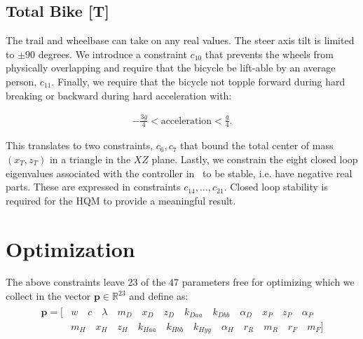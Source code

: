 \documentclass{bmd2019p}
\begin{document}
\subsection{Total Bike [T]}
%
The trail and wheelbase can take on any real values. The steer axis tilt is
limited to $\pm90$ degrees. We introduce a constraint $c_{10}$ that prevents
the wheels from physically overlapping and require that the bicycle be
lift-able by an average person, $c_{11}$. Finally, we require that the bicycle
not topple forward during hard breaking or backward during hard acceleration
with:

\begin{align}
  -\frac{3g}{4} < \textrm{acceleration} < \frac{g}{4}\textrm{.}
\end{align}

This translates to two constraints, $c_6,c_7$ that bound the total center of
mass $(x_T,z_T)$ in a triangle in the $XZ$ plane. Lastly, we constrain the
eight closed loop eigenvalues associated with the controller in~\cite{Hess2012}
to be stable, i.e. have negative real parts. These are expressed in
constraints $c_{14},\ldots,c_{21}$. Closed loop stability is required for the
HQM to provide a meaningful result.

\section{Optimization}
%
The above constraints leave 23 of the 47 parameters free for optimizing which
we collect in the vector $\mathbf{p}\in\mathbb{R}^{23}$ and define as:
%
\begin{align}
  \begin{split}
    \mathbf{p} = [ &
       w        \quad
       c        \quad
       \lambda  \quad
       m_D      \quad
       x_D      \quad
       z_D      \quad
       k_{Daa}  \quad
       k_{Dbb}  \quad
       \alpha_D \quad
       x_P      \quad
       z_P      \quad
       \alpha_P \\
     & m_H      \quad
       x_H      \quad
       z_H      \quad
       k_{Haa}  \quad
       k_{Hbb}  \quad
       k_{Hyy}  \quad
       \alpha_H \quad
       r_R      \quad
       m_R      \quad
       r_F      \quad
       m_F]
  \end{split}
\end{align}
\end{document}
